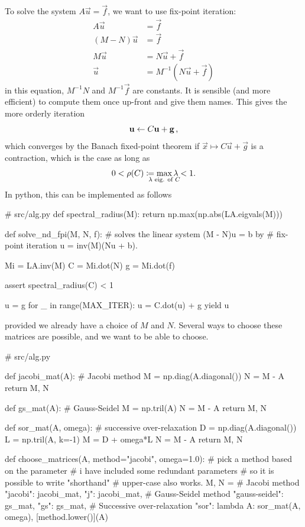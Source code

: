 \documentclass[12pt]{article}
\begin{document}
\begin{multicols*}{2}
    To solve the system $A\vec u = \vec f$, we want to use
    fix-point iteration:
    \begin{align*}
        A \vec u &= \vec f \\
        (M - N) \vec u &= \vec f \\
        M \vec u &= N \vec u + \vec f \\
        \vec u &= M^{-1} (N \vec u + \vec f)
    \end{align*}
    in this equation, $M^{-1}N$ and $M^{-1}\vec f$ are constants.
    It is sensible (and more efficient) to compute them once up-front and give them
    names.
    This gives the more orderly iteration
    \[
        \vec u \leftarrow C\vec u + \vec g \,\text,
    \]
    which converges by the Banach fixed-point theorem if
    $\vec x \mapsto C\vec u + \vec g$ is a contraction,
    which is the case as long as
    \[
        0 < \rho(C) \coloneqq \smashoperator{
            \max_{\lambda \text{ eig. of } C}
        } \lambda < 1
        \text.
    \]
    In python, this can be implemented as follows
    \begin{python}[
        caption={N-dimensional solver.}
    ]
# src/alg.py
def spectral_radius(M):
    return np.max(np.abs(LA.eigvals(M)))

def solve_nd_fpi(M, N, f):
    # solves the linear system (M - N)u = b by
    # fix-point iteration u = inv(M)(Nu + b).

    Mi = LA.inv(M)
    C  = Mi.dot(N)
    g  = Mi.dot(f)

    assert spectral_radius(C) < 1

    u = g
    for _ in range(MAX_ITER):
        u = C.dot(u) + g
        yield u
    \end{python}
    provided we already have a choice of $M$ and $N$.
    Several ways to choose these matrices are possible,
    and we want to be able to choose.
    \begin{python}[
        caption={Argument-``parser'' and choice of $M$, $N$.}
    ]
# src/alg.py

def jacobi_mat(A):
    # Jacobi method
    M = np.diag(A.diagonal())
    N = M - A
    return M, N

def gs_mat(A):
    # Gauss-Seidel
    M = np.tril(A)
    N = M - A
    return M, N

def sor_mat(A, omega):
    # successive over-relaxation
    D = np.diag(A.diagonal())
    L = np.tril(A, k=-1)
    M = D + omega*L
    N = M - A
    return M, N

def choose_matrices(A, method="jacobi", omega=1.0):
    # pick a method based on the parameter
    # i have included some redundant parameters
    # so it is possible to write "shorthand"
    # upper-case also works.
    M, N = {
        # Jacobi method
        "jacobi":        jacobi_mat,
        "j":             jacobi_mat,
        # Gauss-Seidel method
        "gauss-seidel":  gs_mat,
        "gs":            gs_mat,
        # Successive over-relaxation
        "sor": lambda A: sor_mat(A, omega),
    }[method.lower()](A)


\end{python}
\end{multicols*}
\end{document}
